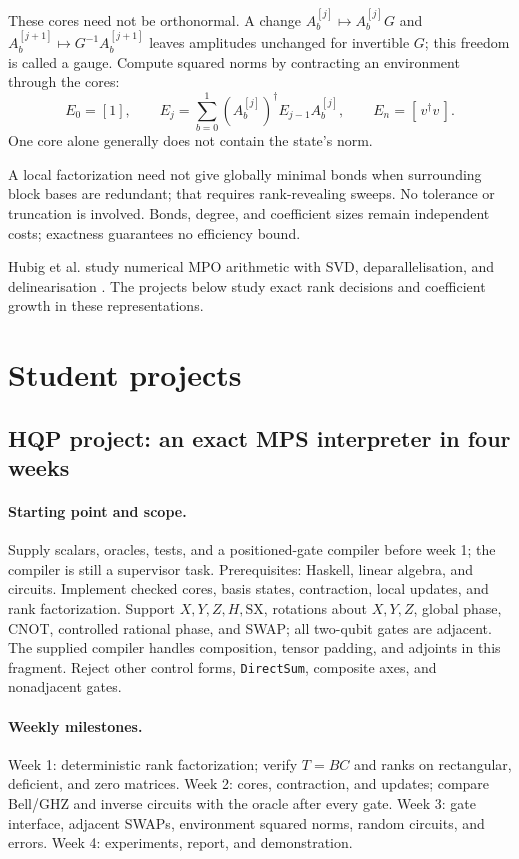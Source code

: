 \documentclass[11pt,a4paper]{article}
\newcommand{\code}[1]{\texttt{#1}}
\begin{document}
These cores need not be orthonormal. A change
$A^{[j]}_b\mapsto A^{[j]}_bG$ and
$A^{[j+1]}_b\mapsto G^{-1}A^{[j+1]}_b$ leaves amplitudes unchanged for
invertible $G$; this freedom is called a gauge.
Compute squared norms by contracting an environment through the cores:
\[
E_0=[1],\qquad
E_j=\sum_{b=0}^1 (A^{[j]}_b)^\dagger E_{j-1}A^{[j]}_b,\qquad
E_n=[\,v^\dagger v\,].
\]
One core alone generally does not contain the state's norm.

A local factorization need not give globally minimal bonds when surrounding
block bases are redundant; that requires rank-revealing sweeps.
No tolerance or truncation is involved. Bonds, degree, and coefficient
sizes remain independent costs; exactness guarantees no efficiency bound.

Hubig et al. study numerical MPO arithmetic with SVD, deparallelisation,
and delinearisation \cite{hubig}. The projects below study exact rank
decisions and coefficient growth in these representations.

\section{Student projects}
\subsection{HQP project: an exact MPS interpreter in four weeks}
\label{sec:hqp}
\paragraph{Starting point and scope.}
Supply scalars, oracles, tests, and a positioned-gate compiler before week 1;
the compiler is still a supervisor task. Prerequisites: Haskell, linear algebra,
and circuits.
Implement checked cores, basis states, contraction, local updates, and rank
factorization. Support $X,Y,Z,H,\mathrm{SX}$, rotations about $X,Y,Z$, global phase,
CNOT, controlled rational phase, and SWAP; all two-qubit gates are adjacent.
The supplied compiler handles composition, tensor padding, and adjoints in
this fragment. Reject other control forms, \code{DirectSum}, composite axes, and
nonadjacent gates.

\paragraph{Weekly milestones.}
Week 1: deterministic rank factorization; verify $T=BC$ and ranks on
rectangular, deficient, and zero matrices.
Week 2: cores, contraction, and updates; compare Bell/GHZ and inverse circuits
with the oracle after every gate.
Week 3: gate interface, adjacent SWAPs, environment squared norms, random
circuits, and errors. Week 4: experiments, report, and demonstration.
\end{document}
